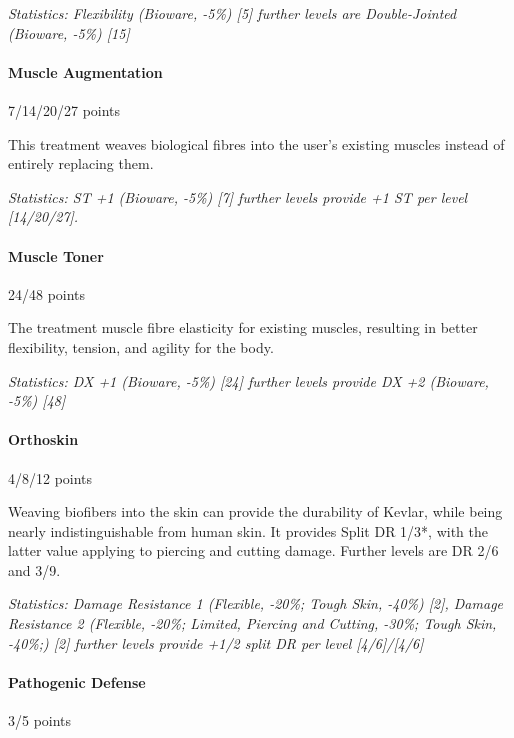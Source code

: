 \begin{multicols*}{3}
	\textit{\textcolor{OliveGreen}{Statistics: Flexibility (Bioware, -5\%) [5] further levels are Double-Jointed (Bioware, -5\%) [15]}}
	
	\paragraph{Muscle Augmentation}
	\begin{flushright}
		7/14/20/27 points
	\end{flushright}
	
	This treatment weaves biological fibres into the user's existing muscles instead of entirely replacing them.
	
	\textit{\textcolor{OliveGreen}{Statistics: ST +1 (Bioware, -5\%) [7] further levels provide +1 ST per level [14/20/27].}}
	
	\paragraph{Muscle Toner}
	\begin{flushright}
		24/48 points
	\end{flushright}
	
	The treatment muscle fibre elasticity for existing muscles, resulting in better flexibility, tension, and agility for the body.
	
	\textit{\textcolor{OliveGreen}{Statistics: DX +1 (Bioware, -5\%) [24] further levels provide DX +2 (Bioware, -5\%) [48]}}
	
	\paragraph{Orthoskin}
	\begin{flushright}
		4/8/12 points
	\end{flushright}
	
	Weaving biofibers into the skin can provide the durability of Kevlar, while being nearly indistinguishable from human skin. It provides Split DR 1/3*, with the latter value applying to piercing and cutting damage. Further levels are DR 2/6 and 3/9.
	
	\textit{\textcolor{OliveGreen}{Statistics: Damage Resistance 1 (Flexible, -20\%; Tough Skin, -40\%) [2], Damage Resistance 2 (Flexible, -20\%; Limited, Piercing and Cutting, -30\%; Tough Skin, -40\%;) [2] further levels provide +1/2 split DR per level [4/6]/[4/6]}}
	
	\paragraph{Pathogenic Defense}
	\begin{flushright}
		3/5 points
	\end{flushright}
	

\end{multicols*}
